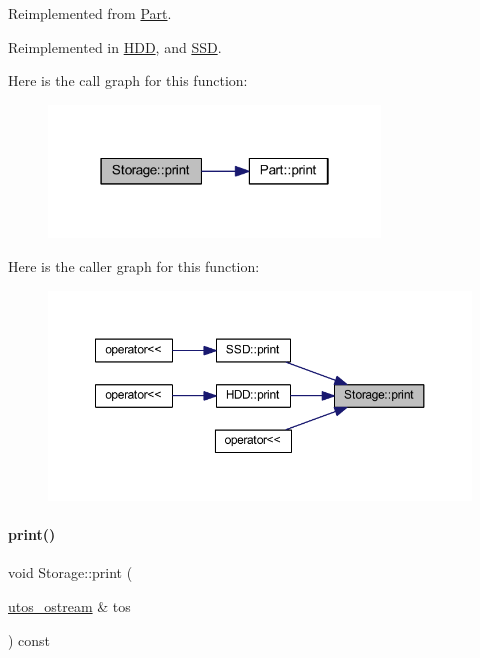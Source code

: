 Reimplemented from \mbox{\hyperlink{class_part_a4fa402b8e8fd4236ff773a7697ab2bc3}{Part}}.



Reimplemented in \mbox{\hyperlink{class_h_d_d_a07c34356018542934a4dd91ce38b0821}{H\+DD}}, and \mbox{\hyperlink{class_s_s_d_a3c07aa0fd7bb547cfb4a775513e427a9}{S\+SD}}.

Here is the call graph for this function\+:
\nopagebreak
\begin{figure}[H]
\begin{center}
\leavevmode
\includegraphics[width=250pt]{class_storage_aa9f6ffb0fd45839b54bd4e254270445d_cgraph}
\end{center}
\end{figure}
Here is the caller graph for this function\+:
\nopagebreak
\begin{figure}[H]
\begin{center}
\leavevmode
\includegraphics[width=350pt]{class_storage_aa9f6ffb0fd45839b54bd4e254270445d_icgraph}
\end{center}
\end{figure}
\mbox{\label{class_storage_ab7ecf9e0777891b4e1a84bbf391a1cd4}} 
\paragraph{\texorpdfstring{print()}{print()}\hspace{0.1cm}{\footnotesize\ttfamily [2/4]}}
{\footnotesize\ttfamily void Storage\+::print (\begin{DoxyParamCaption}\item[{\mbox{\hyperlink{structutos__ostream}{utos\+\_\+ostream}} \&}]{tos }\end{DoxyParamCaption}) const\hspace{0.3cm}{\ttfamily [virtual]}}



